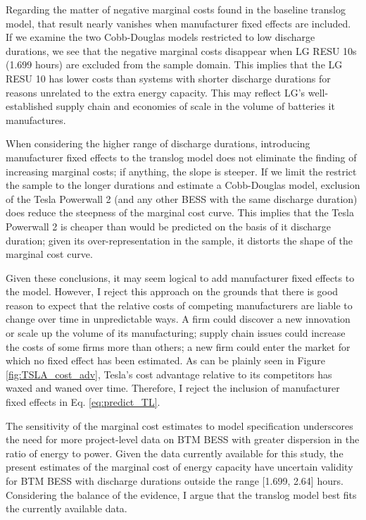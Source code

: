 Regarding the matter of negative marginal costs found in the baseline translog model, that result nearly vanishes when manufacturer fixed effects are included. If we examine the two Cobb-Douglas models restricted to low discharge durations, we see that the negative marginal costs disappear when LG RESU 10s (1.699 hours) are excluded from the sample domain. This implies that the LG RESU 10 has lower costs than systems with shorter discharge durations for reasons unrelated to the extra energy capacity. This may reflect LG's well-established supply chain and economies of scale in the volume of batteries it manufactures. 

When considering the higher range of discharge durations, introducing manufacturer fixed effects to the translog model does not eliminate the finding of increasing marginal costs; if anything, the slope is steeper. If we limit the restrict the sample to the longer durations and estimate a Cobb-Douglas model,  exclusion of the Tesla Powerwall 2 (and any other BESS with the same discharge duration) does reduce the steepness of the marginal cost curve. This implies that the Tesla Powerwall 2 is cheaper than would be predicted on the basis of it discharge duration; given its over-representation in the sample, it distorts the shape of the marginal cost curve.

Given these conclusions, it may seem logical to add manufacturer fixed effects to the model. However, I reject this approach on the grounds that there is good reason to expect that the relative costs of competing manufacturers are liable to change over time in unpredictable ways. A firm could discover a new innovation or scale up the volume of its manufacturing; supply chain issues could increase the costs of some firms more than others; a new firm could enter the market for which no fixed effect has been estimated. As can be plainly seen in Figure \ref{fig:TSLA_cost_adv}, Tesla's cost advantage relative to its competitors has waxed and waned over time. Therefore, I reject the inclusion of manufacturer fixed effects in Eq. \ref{eq:predict_TL}.

The sensitivity of the marginal cost estimates to model specification underscores the need for more project-level data on BTM BESS with greater dispersion in the ratio of energy to power. Given the data currently available for this study, the present estimates of the marginal cost of energy capacity have uncertain validity for BTM BESS with discharge durations outside the range [1.699, 2.64] hours. Considering the balance of the evidence, I argue that the translog model best fits the currently available data.


